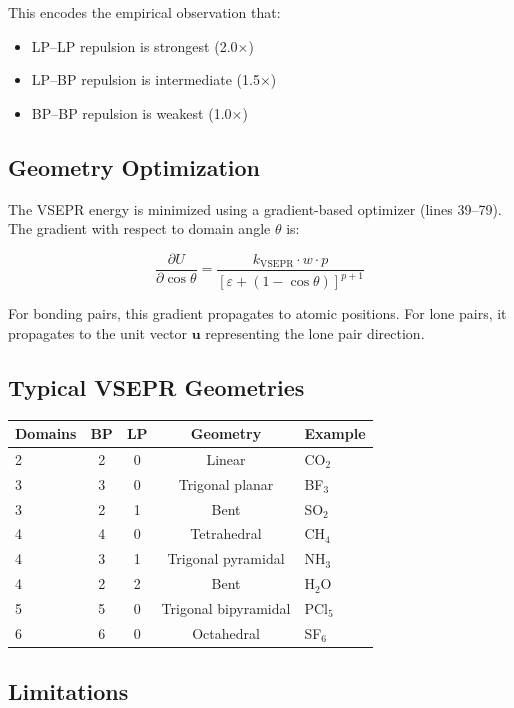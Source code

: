 \documentclass[11pt]{article}
\begin{document}
This encodes the empirical observation that:
\begin{itemize}
\item LP--LP repulsion is strongest (2.0$\times$)
\item LP--BP repulsion is intermediate (1.5$\times$)
\item BP--BP repulsion is weakest (1.0$\times$)
\end{itemize}

\subsection{Geometry Optimization}

The VSEPR energy is minimized using a gradient-based optimizer (lines 39--79). The gradient with respect to domain angle $\theta$ is:

\begin{equation}
\frac{\partial U}{\partial \cos\theta} = \frac{k_{\text{VSEPR}} \cdot w \cdot p}{[\varepsilon + (1 - \cos\theta)]^{p+1}}
\end{equation}

For bonding pairs, this gradient propagates to atomic positions. For lone pairs, it propagates to the unit vector $\mathbf{u}$ representing the lone pair direction.

\subsection{Typical VSEPR Geometries}

\begin{center}
\begin{tabular}{lcccl}
\toprule
Domains & BP & LP & Geometry & Example \\
\midrule
2 & 2 & 0 & Linear & CO$_2$ \\
3 & 3 & 0 & Trigonal planar & BF$_3$ \\
3 & 2 & 1 & Bent & SO$_2$ \\
4 & 4 & 0 & Tetrahedral & CH$_4$ \\
4 & 3 & 1 & Trigonal pyramidal & NH$_3$ \\
4 & 2 & 2 & Bent & H$_2$O \\
5 & 5 & 0 & Trigonal bipyramidal & PCl$_5$ \\
6 & 6 & 0 & Octahedral & SF$_6$ \\
\bottomrule
\end{tabular}
\end{center}

\subsection{Limitations}
\end{document}
